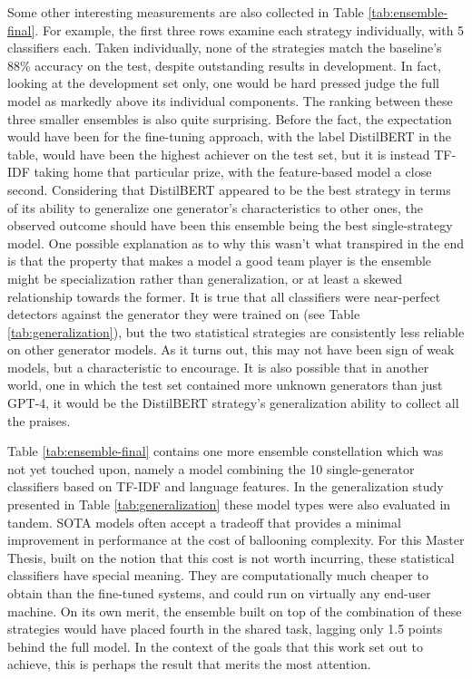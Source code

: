 Some other interesting measurements are also collected in Table \ref{tab:ensemble-final}.
For example, the first three rows examine each strategy individually, with 5 classifiers each.
Taken individually, none of the strategies match the baseline's 88\% accuracy on the test, despite outstanding results in development.
In fact, looking at the development set only, one would be hard pressed judge the full model as markedly above its individual components.
The ranking between these three smaller ensembles is also quite surprising.
Before the fact, the expectation would have been for the fine-tuning approach, with the label DistilBERT in the table, would have been the highest achiever on the test set, but it is instead TF-IDF taking home that particular prize, with the feature-based model a close second.
Considering that DistilBERT appeared to be the best strategy in terms of its ability to generalize one generator's characteristics to other ones, the observed outcome should have been this ensemble being the best single-strategy model.
One possible explanation as to why this wasn't what transpired in the end is that the property that makes a model a good team player is the ensemble might be specialization rather than generalization, or at least a skewed relationship towards the former.
It is true that all classifiers were near-perfect detectors against the generator they were trained on (see Table \ref{tab:generalization}), but the two statistical strategies are consistently less reliable on other generator models.
As it turns out, this may not have been sign of weak models, but a characteristic to encourage.
It is also possible that in another world, one in which the test set contained more unknown generators than just GPT-4, it would be the DistilBERT strategy's generalization ability to collect all the praises.

Table \ref{tab:ensemble-final} contains one more ensemble constellation which was not yet touched upon, namely a model combining the 10 single-generator classifiers based on TF-IDF and language features.
In the generalization study presented in Table \ref{tab:generalization} these model types were also evaluated in tandem.
SOTA models often accept a tradeoff that provides a minimal improvement in performance at the cost of ballooning complexity.
For this Master Thesis, built on the notion that this cost is not worth incurring, these statistical classifiers have special meaning.
They are computationally much cheaper to obtain than the fine-tuned systems, and could run on virtually any end-user machine.
On its own merit, the ensemble built on top of the combination of these strategies would have placed fourth in the shared task, lagging only 1.5 points behind the full model.
In the context of the goals that this work set out to achieve, this is perhaps the result that merits the most attention.

